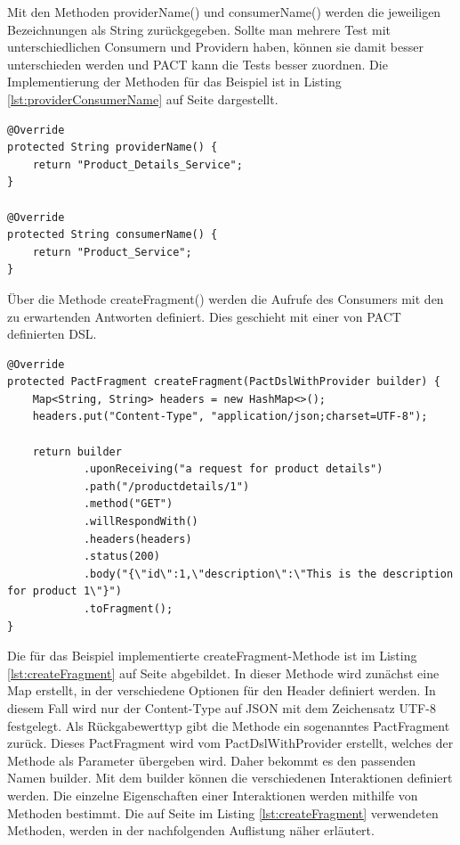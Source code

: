 \documentclass{llncs}
\begin{document}
Mit den Methoden providerName() und consumerName() werden die jeweiligen Bezeichnungen als String zurückgegeben. Sollte man mehrere Test mit unterschiedlichen Consumern und Providern haben, können sie damit besser unterschieden werden und PACT kann die Tests besser zuordnen. Die Implementierung der Methoden für das Beispiel ist in Listing \ref{lst:providerConsumerName} auf Seite  \pageref{lst:providerConsumerName} dargestellt.
\lstset{language = Java}
\begin{lstlisting}[caption=Implementierung von providerName() und consumerName(),label=lst:providerConsumerName]
@Override
protected String providerName() {
    return "Product_Details_Service";
}

@Override
protected String consumerName() {
    return "Product_Service";
}
\end{lstlisting}

Über die Methode createFragment() werden die Aufrufe des Consumers mit den zu erwartenden Antworten definiert. Dies geschieht mit einer von PACT definierten DSL.
\lstset{language = Java}
\begin{lstlisting}[caption=Implementierung createFragment(),label=lst:createFragment]
@Override
protected PactFragment createFragment(PactDslWithProvider builder) {
    Map<String, String> headers = new HashMap<>();
    headers.put("Content-Type", "application/json;charset=UTF-8");
        
    return builder
      		.uponReceiving("a request for product details")
            .path("/productdetails/1")
            .method("GET")
            .willRespondWith()
            .headers(headers)
            .status(200)
            .body("{\"id\":1,\"description\":\"This is the description for product 1\"}")
            .toFragment();
}
\end{lstlisting}
Die für das Beispiel implementierte createFragment-Methode ist im Listing \ref{lst:createFragment} auf Seite \pageref{lst:createFragment} abgebildet. In dieser Methode wird zunächst eine Map erstellt, in der verschiedene Optionen für den Header definiert werden. In diesem Fall wird nur der Content-Type auf JSON mit dem Zeichensatz UTF-8 festgelegt. Als Rückgabewerttyp gibt die Methode ein sogenanntes PactFragment zurück. Dieses PactFragment wird vom PactDslWithProvider erstellt, welches der Methode als Parameter übergeben wird. Daher bekommt es den passenden Namen builder. Mit dem builder können die verschiedenen Interaktionen definiert werden. Die einzelne Eigenschaften einer Interaktionen werden mithilfe von Methoden bestimmt. Die auf Seite \pageref{lst:createFragment} im Listing \ref{lst:createFragment} verwendeten Methoden, werden in der nachfolgenden Auflistung näher erläutert. 
\end{document}
